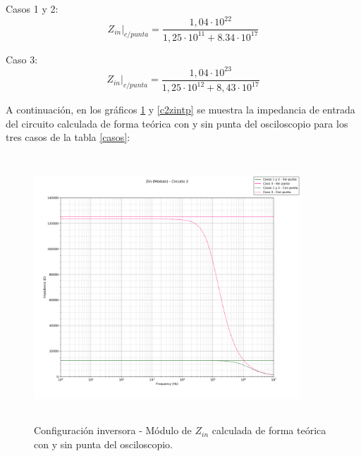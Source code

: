 Casos 1 y 2:
\begin{equation}
	Z_{in}\rvert_{c/punta} = \frac{1,04 \cdot 10^{22}}{1,25 \cdot 10^11 + 8.34 \cdot 10^{17}}
	\label{c2c1zinp}
\end{equation}

Caso 3:
\begin{equation}
	Z_{in}\rvert_{c/punta} = \frac{1,04 \cdot 10^{23}}{1,25 \cdot 10^{12} + 8,43 \cdot 10^{17}}
	\label{c2c3zinp}
\end{equation}


A continuaci\'on, en los gr\'aficos \ref{c2zintm} y \ref{c2zintp} se muestra la impedancia de entrada del circuito calculada de forma te\'orica con y sin punta del osciloscopio para los tres casos de la tabla \ref{casos}:

\begin{figure}[H] %
	\centering
	\includegraphics[width=10cm,height=10cm,keepaspectratio]{../EJ1/00GRAFICOS/teoricos/circ2zinm.png}
	\caption{Configuración inversora - M\'odulo de $Z_{in}$ calculada de forma te\'orica con y sin punta del osciloscopio.}
	\label{c2zintm}
\end{figure}

